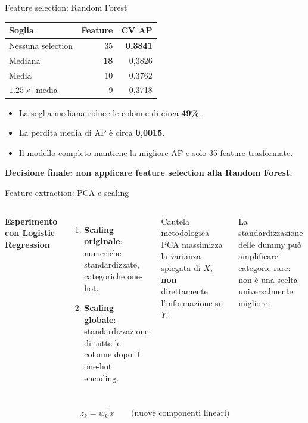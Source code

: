 \documentclass[10pt,aspectratio=169]{beamer}
\newcommand{\keypoint}[1]{\par\vspace{0.45em}\noindent{\color{teal}\rule{2.4pt}{1.25em}}\hspace{0.7em}\parbox[t]{0.92\linewidth}{\raggedright\textbf{#1}}}
\newcommand{\tightitems}{\setlength{\itemsep}{.5em}}
\begin{document}
\begin{frame}{Feature selection: Random Forest}
\centering
\begin{tabular}{@{}lrr@{}}\toprule
\textbf{Soglia} & \textbf{Feature} & \textbf{CV AP}\\\midrule
Nessuna selection & 35 & \textbf{0,3841}\\
\rowcolor{pale} Mediana & \textbf{18} & 0,3826\\
Media & 10 & 0,3762\\
$1.25\times$ media & 9 & 0,3718\\\bottomrule\end{tabular}
\vspace{1em}
\begin{itemize}\tightitems
\item La soglia mediana riduce le colonne di circa \textbf{49\%}.
\item La perdita media di AP è circa \textbf{0,0015}.
\item Il modello completo mantiene la migliore AP e solo 35 feature trasformate.
\end{itemize}
\keypoint{Decisione finale: non applicare feature selection alla Random Forest.}
\end{frame}

\begin{frame}{Feature extraction: PCA e scaling}
\begin{columns}[T,onlytextwidth]
\textbf{Esperimento con Logistic Regression}\par\medskip
\begin{enumerate}\setlength{\itemsep}{.7em}
\item \textbf{Scaling originale}: numeriche standardizzate, categoriche one-hot.
\item \textbf{Scaling globale}: standardizzazione di tutte le colonne dopo il one-hot encoding.
\end{enumerate}
\begin{block}{Cautela metodologica}
PCA massimizza la varianza spiegata di $X$, \textbf{non} direttamente l'informazione su $Y$.
\end{block}
\vspace{.35em}
{\small La standardizzazione delle dummy può amplificare categorie rare: non è una scelta universalmente migliore.}
\end{columns}
\vspace{.45em}
\[z_k=w_k^\top x\qquad\text{(nuove componenti lineari)}\]
\end{frame}
\end{document}
